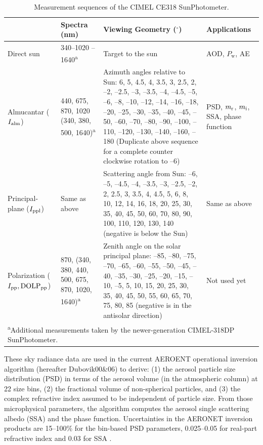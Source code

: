 \begin{table}[t]
  \centering
  \footnotesize
  \caption{Measurement sequences of the CIMEL CE318 SunPhotometer.}
  \label{tab:cimel318}
  \begin{tabular}{p{5em} p{8em} p{20em} p{6em} }
    \toprule
           & Spectra (nm)& Viewing Geometry ($^\circ$)& Applications \\ 
    \midrule
    Direct sun & 340--1020 \newline 340--1640\textsuperscript{a} & Target to
the sun & AOD, \newline $P_\text{w}$, AE \\
    \hline
    Almucantar ($I_\text{alm}$)& 440, 675, 870, 1020 \newline (340, 380, 500,
1640)\textsuperscript{a} & Azimuth angles relative to
Sun: 6, 5, 4.5, 4, 3.5, 3, 2.5, 2, --2, --2.5, --3, --3.5, --4, --4.5, --5, --6,
--8, --10, --12, --14, --16, --18, --20, --25, --30, --35, --40, --45, --50,
--60, --70, --80, --90, --100, --110, --120, --130, --140, --160, --180
(Duplicate above sequence for a complete counter clockwise rotation to --6) & 
PSD, \newline $m_\text{r}$, $m_\text{i}$, \newline SSA, \newline phase function\\
    \hline
    Principal-plane ($I_\text{ppl}$)& Same as above & Scattering angle from
Sun: --6, --5, --4.5, --4, --3.5, --3, --2.5, --2, 2, 2.5, 3, 3.5, 4, 4.5, 5,
6, 8, 10, 12, 14, 16, 18, 20, 25, 30, 35, 40, 45, 50, 60, 70, 80, 90, 100, 110, 
120, 130, 140 (negative is below the Sun) & Same as above \\
    \hline
    Polarization ($I_\text{pp}, \text{DOLP}_\text{pp}$) & 870, \newline (340, 380, 440, 500, 675, 870, 1020,
1640)\textsuperscript{a} & Zenith angle on the
solar principal plane: --85, --80, --75, --70, --65, --60, --55, --50, --45,
--40, --35, --30, --25, --20, --15, --10, --5, 5, 10, 15, 20, 25, 30, 35, 40, 
45, 50, 55, 60, 65, 70, 75, 80, 85 (negative is in the antisolar direction) &
Not used yet \\
    \bottomrule
     \multicolumn{4}{m{35em}}{\textsuperscript{a}Additional measurements taken
by the newer-generation CIMEL-318DP SunPhotometer.}
  \end{tabular}
\end{table}

These sky radiance data are used in the current AEROENT operational inversion
algorithm \citep{Dubovik00a,Dubovik06} (hereafter Dubovik00\&06) to derive: 
(1) the aerosol particle size distribution (PSD) in
terms of the aerosol volume (in the atmospheric column) at 22 size bins, (2)
the fractional volume of non-spherical particles, and (3) the complex
refractive index assumed to be independent of particle size. From
those microphysical parameters, the \Dub algorithm computes the aerosol
single scattering albedo (SSA) and the phase function. Uncertainties in
the AERONET inversion products are 15--100\% for the bin-based PSD parameters,
0.025--0.05 for real-part refractive index and 0.03 for SSA \citep{Dubovik00b}.

